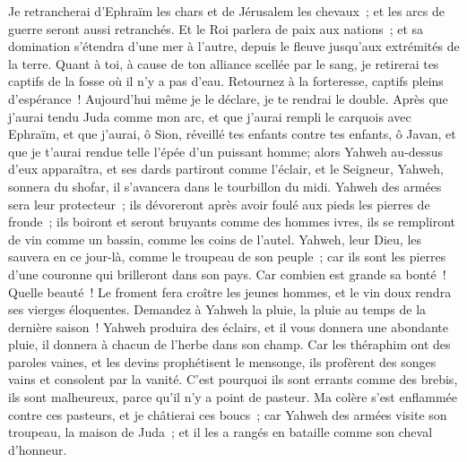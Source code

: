 \begin{multicols}{2}
Je retrancherai d'Ephraïm les chars et de Jérusalem les chevaux~; et les arcs de guerre seront aussi retranchés. Et le Roi parlera de paix aux nations~; et sa domination s'étendra d'une mer à l'autre, depuis le fleuve jusqu'aux extrémités de la terre.
Quant à toi, à cause de ton alliance scellée par le sang, je retirerai tes captifs de la fosse où il n'y a pas d'eau.
Retournez à la forteresse, captifs pleins d'espérance~! Aujourd'hui même je le déclare, je te rendrai le double.
Après que j'aurai tendu Juda comme mon arc, et que j'aurai rempli le carquois avec Ephraïm, et que j'aurai, ô Sion, réveillé tes enfants contre tes enfants, ô Javan, et que je t'aurai rendue telle l'épée d'un puissant homme;
alors Yahweh au-dessus d'eux apparaîtra, et ses dards partiront comme l'éclair, et le Seigneur, Yahweh, sonnera du shofar, il s'avancera dans le tourbillon du midi.
Yahweh des armées sera leur protecteur~; ils dévoreront après avoir foulé aux pieds les pierres de fronde~; ils boiront et seront bruyants comme des hommes ivres, ils se rempliront de vin comme un bassin, comme les coins de l'autel.
Yahweh, leur Dieu, les sauvera en ce jour-là, comme le troupeau de son peuple~; car ils sont les pierres d'une couronne qui brilleront dans son pays.
Car combien est grande sa bonté~! Quelle beauté~! Le froment fera croître les jeunes hommes, et le vin doux rendra ses vierges éloquentes.
\VerseOne{}Demandez à Yahweh la pluie, la pluie au temps de la dernière saison~! Yahweh produira des éclairs, et il vous donnera une abondante pluie, il donnera à chacun de l'herbe dans son champ.
Car les théraphim ont des paroles vaines, et les devins prophétisent le mensonge, ils profèrent des songes vains et consolent par la vanité. C'est pourquoi ils sont errants comme des brebis, ils sont malheureux, parce qu'il n'y a point de pasteur.
Ma colère s'est enflammée contre ces pasteurs, et je châtierai ces boucs~; car Yahweh des armées visite son troupeau, la maison de Juda~; et il les a rangés en bataille comme son cheval d'honneur.

\end{multicols}
